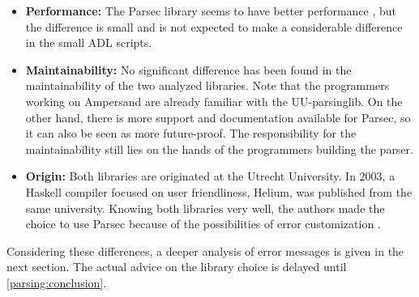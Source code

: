 \begin{itemize}
	\item \textbf{Performance:} The Parsec library seems to have better performance , but the difference is small and is not expected to make a considerable difference in the small ADL scripts.
	\item \textbf{Maintainability:} No significant difference has been found in the maintainability of the two analyzed libraries.
		Note that the programmers working on Ampersand are already familiar with the UU-parsinglib.
		On the other hand, there is more support and documentation available for Parsec, so it can also be seen as more future-proof.
		The responsibility for the maintainability still lies on the hands of the programmers building the parser.
	\item \textbf{Origin:} Both libraries are originated at the Utrecht University.
		In 2003, a Haskell compiler focused on user friendliness, Helium, was published from the same university.
		Knowing both libraries very well, the authors made the choice to use Parsec because of the possibilities of error customization .
\end{itemize}
%
Considering these differences, a deeper analysis of error messages is given in the next section.
The actual advice on the library choice is delayed until \autoref{parsing:conclusion}.
